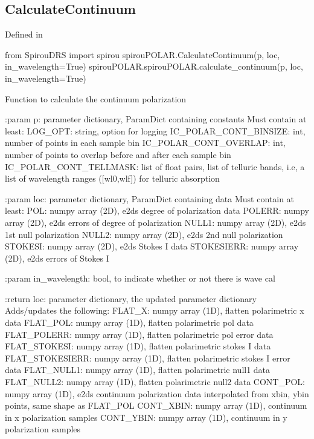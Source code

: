 \noindent\begin{minipage}{\textwidth}
\subsection{CalculateContinuum}

Defined in \spirouPOLAR{}

\begin{pythonbox}
from SpirouDRS import spirou
spirouPOLAR.CalculateContinuum(p, loc, in_wavelength=True)
spirouPOLAR.spirouPOLAR.calculate_continuum(p, loc, in_wavelength=True)
\end{pythonbox}

\begin{pythondocstring}
Function to calculate the continuum polarization
    
:param p: parameter dictionary, ParamDict containing constants
    Must contain at least:
        LOG_OPT: string, option for logging
        IC_POLAR_CONT_BINSIZE: int, number of points in each sample bin
        IC_POLAR_CONT_OVERLAP: int, number of points to overlap before and
                               after each sample bin
        IC_POLAR_CONT_TELLMASK: list of float pairs, list of telluric bands,
                                i.e, a list of wavelength ranges ([wl0,wlf]) 
                                for telluric absorption
    
:param loc: parameter dictionary, ParamDict containing data
    Must contain at least:
        POL: numpy array (2D), e2ds degree of polarization data
        POLERR: numpy array (2D), e2ds errors of degree of polarization
        NULL1: numpy array (2D), e2ds 1st null polarization
        NULL2: numpy array (2D), e2ds 2nd null polarization
        STOKESI: numpy array (2D), e2ds Stokes I data
        STOKESIERR: numpy array (2D), e2ds errors of Stokes I
    
:param in_wavelength: bool, to indicate whether or not there is wave cal

:return loc: parameter dictionary, the updated parameter dictionary
    Adds/updates the following:
        FLAT_X: numpy array (1D), flatten polarimetric x data
        FLAT_POL: numpy array (1D), flatten polarimetric pol data
        FLAT_POLERR: numpy array (1D), flatten polarimetric pol error data
        FLAT_STOKESI: numpy array (1D), flatten polarimetric stokes I data
        FLAT_STOKESIERR: numpy array (1D), flatten polarimetric stokes I 
                         error data
        FLAT_NULL1: numpy array (1D), flatten polarimetric null1 data
        FLAT_NULL2: numpy array (1D), flatten polarimetric null2 data
        CONT_POL: numpy array (1D), e2ds continuum polarization data
                  interpolated from xbin, ybin points, same shape as 
                  FLAT_POL
        CONT_XBIN: numpy array (1D), continuum in x polarization samples 
        CONT_YBIN: numpy array (1D), continuum in y polarization samples
\end{pythondocstring}
\end{minipage}


